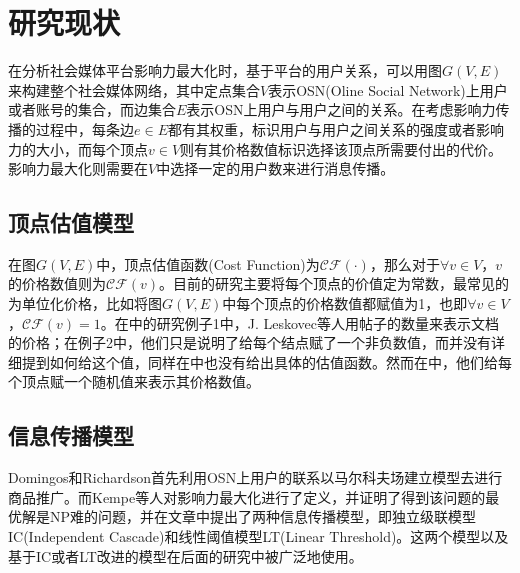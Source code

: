 \section{研究现状}
在分析社会媒体平台影响力最大化时，基于平台的用户关系，可以用图$G(V, E)$来构建整个社会媒体网络，其中定点集合$V$表示OSN(Oline Social Network)上用户或者账号的集合，而边集合$E$表示OSN上用户与用户之间的关系。在考虑影响力传播的过程中，每条边$e \in E$都有其权重，标识用户与用户之间关系的强度或者影响力的大小，而每个顶点$v \in V$则有其价格数值标识选择该顶点所需要付出的代价。影响力最大化则需要在$V$中选择一定的用户数来进行消息传播。


\subsection{顶点估值模型}
在图$G(V, E)$中，顶点估值函数(Cost Function)为$\mathcal{CF}(\cdot)$，那么对于$\forall v \in V$，$v$的价格数值则为$\mathcal{CF}(v)$。目前的研究主要将每个顶点的价值定为常数，最常见的为单位化价格，比如\cite{he2012influence}\cite{kempe2003maximizing}\cite{chen2011influence}\cite{chen2010scalableKDD}\cite{chen2009efficient}将图$G(V, E)$中每个顶点的价格数值都赋值为1，也即$\forall v \in V$，$\mathcal{CF}(v) = 1$。在\cite{leskovec2007cost}中的研究例子1中，J. Leskovec等人用帖子的数量来表示文档的价格；在例子2中，他们只是说明了给每个结点赋了一个非负数值，而并没有详细提到如何给这个值，同样在\cite{han2014balanced}中也没有给出具体的估值函数。然而在\cite{nguyen2013budgeted}中，他们给每个顶点赋一个随机值来表示其价格数值。


\subsection{信息传播模型}
Domingos\cite{domingos2001mining}和Richardson\cite{richardson2002mining}首先利用OSN上用户的联系以马尔科夫场建立模型去进行商品推广。而Kempe\cite{kempe2003maximizing}等人对影响力最大化进行了定义，并证明了得到该问题的最优解是NP难的问题，并在文章中提出了两种信息传播模型，即独立级联模型IC(Independent Cascade)和线性阈值模型LT(Linear Threshold)。这两个模型以及基于IC或者LT改进的模型在后面的研究中被广泛地使用。


